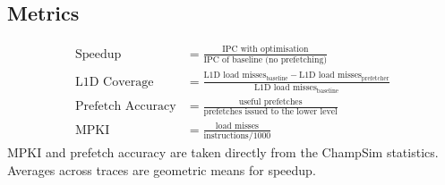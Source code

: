 \documentclass[12pt, a4paper]{article}
\newcommand{\tablesetup}{\small\renewcommand{\arraystretch}{1.15}\setlength{\tabcolsep}{4pt}}
\newcommand{\colhead}[1]{\textbf{#1}}
\begin{document}

\subsection{Metrics}\label{sec:metrics}
\begin{align}
\text{Speedup} &= \frac{\text{IPC with optimisation}}{\text{IPC of baseline (no prefetching)}} \label{eq:speedup}\\[4pt]
\text{L1D Coverage} &= \frac{\text{L1D load misses}_{\text{baseline}} - \text{L1D load misses}_{\text{prefetcher}}}{\text{L1D load misses}_{\text{baseline}}} \label{eq:coverage}\\[4pt]
\text{Prefetch Accuracy} &= \frac{\text{useful prefetches}}{\text{prefetches issued to the lower level}} \label{eq:accuracy}\\[4pt]
\text{MPKI} &= \frac{\text{load misses}}{\text{instructions}/1000} \label{eq:mpki}
\end{align}
MPKI and prefetch accuracy are taken directly from the ChampSim statistics. Averages across traces are
geometric means for speedup.
\end{document}
